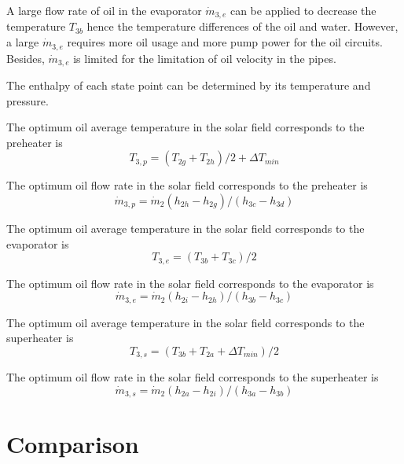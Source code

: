 A large flow rate of oil in the evaporator $\dot{m}_{3,e}$ can be applied to decrease the temperature $T_{3b}$ hence the temperature differences of the oil and water. However, a large $\dot{m}_{3,e}$ requires more oil usage and more pump power for the oil circuits. Besides, $\dot{m}_{3,e}$ is limited for the limitation of oil velocity in the pipes.

The enthalpy of each state point can be determined by its temperature and pressure.

The optimum oil average temperature in the solar field corresponds to the preheater is
\begin{equation}
  T_{3,p} = (T_{2g} + T_{2h})/2 + \Delta T_{min}
\end{equation}

The optimum oil flow rate in the solar field corresponds to the preheater is
\begin{equation}
  \dot{m}_{3,p} = \dot{m}_{2}(h_{2h} - h_{2g})/(h_{3c} - h_{3d})
\end{equation}

The optimum oil average temperature in the solar field corresponds to the evaporator is
\begin{equation}
  T_{3,e} = (T_{3b} + T_{3c})/2
\end{equation}

The optimum oil flow rate in the solar field corresponds to the evaporator is
\begin{equation}
  \dot{m}_{3,e} = \dot{m}_{2}(h_{2i} - h_{2h})/(h_{3b} - h_{3c})
  \label{eq:m_3e}
\end{equation}

The optimum oil average temperature in the solar field corresponds to the superheater is
\begin{equation}
  T_{3,s} = (T_{3b} + T_{2a} + \Delta T_{min})/2
\end{equation}

The optimum oil flow rate in the solar field corresponds to the superheater is
\begin{equation}
  \dot{m}_{3,s} = \dot{m}_{2}(h_{2a} - h_{2i})/(h_{3a} - h_{3b})
\end{equation}

\section{Comparison}

